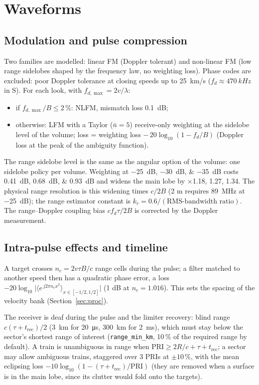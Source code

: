 \documentclass[11pt,a4paper]{article}
\newcommand{\code}[1]{\texttt{\small #1}}
\begin{document}
\section{Waveforms}\label{sec:wf}

\subsection{Modulation and pulse compression}
Two families are modelled: linear FM (Doppler tolerant) and non-linear FM (low range sidelobes shaped by the frequency
law, no weighting loss). Phase codes are excluded: poor Doppler tolerance at closing speeds up to \SI{25}{km/s}
($f_d \approx \SI{470}{kHz}$ in S). For each look, with $f_{d,\max} = 2v/\lambda$:
\begin{itemize}
  \item if $f_{d,\max}/B \le 2\,\%$: NLFM, mismatch loss \SI{0.1}{dB};
  \item otherwise: LFM with a Taylor ($\bar n = 5$) receive-only weighting at the sidelobe level of the volume; loss =
        weighting loss $-\,20\log_{10}(1-f_d/B)$ (Doppler loss at the peak of the ambiguity function).
\end{itemize}
The range sidelobe level is the same as the angular option of the volume: one sidelobe policy per volume. Weighting
at \SIlist{-25;-30;-35}{dB} costs \SIlist{0.41;0.68;0.93}{dB} and widens the main lobe by $\times$1.18, 1.27, 1.34.
The physical range resolution is this widening times $c/2B$ (2 m requires \SI{89}{MHz} at \SI{-25}{dB}); the range
estimator constant is $k_r = 0.6/(\text{RMS-bandwidth ratio})$. The range--Doppler coupling bias $c f_d \tau/2B$ is
corrected by the Doppler measurement.

\subsection{Intra-pulse effects and timeline}
A target crosses $n_c = 2v\tau B/c$ range cells during the pulse; a filter matched to another speed then has a
quadratic phase error, a loss $-20\log_{10}\bigl|\langle e^{\,j2\pi n_c x^2}\rangle_{x\in[-1/2,1/2]}\bigr|$ (1 dB at
$n_c = 1.016$). This sets the spacing of the velocity bank (Section~\ref{sec:proc}).

The receiver is deaf during the pulse and the limiter recovery: blind range $c(\tau + t_{\mathrm{rec}})/2$ (\SI{3}{km}
for \SI{20}{\micro s}, \SI{300}{km} for \SI{2}{ms}), which must stay below the sector's shortest range of interest
(\code{range\_min\_km}, 10\,\% of the required range by default). A train is unambiguous in range when
$\mathrm{PRI} \ge 2R/c + \tau + t_{\mathrm{rec}}$; a sector may allow ambiguous trains, staggered over 3 PRIs at
$\pm10\,\%$, with the mean eclipsing loss $-10\log_{10}(1-(\tau+t_{\mathrm{rec}})/\mathrm{PRI})$ (they are removed when
a surface is in the main lobe, since its clutter would fold onto the targets).
\end{document}
